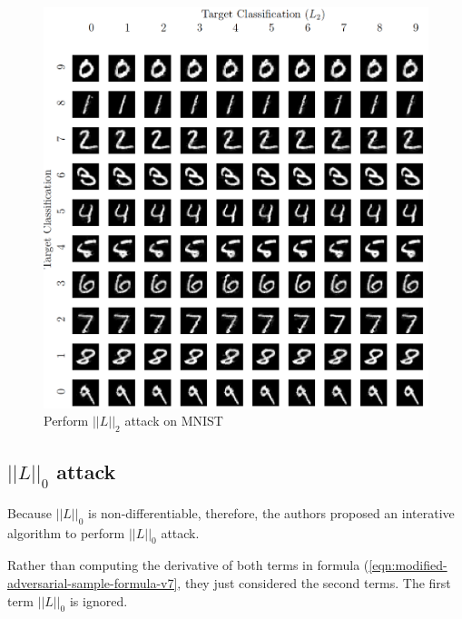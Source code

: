 \documentclass[12pt]{article}
\begin{document}
\begin{figure}[h]
	\centering
	\caption{Perform $||L||_2$ attack on MNIST}
		\label{fig:L2-attack-sample}
	\includegraphics[scale=0.47]{img/L2-attack-sample}
\end{figure}

\subsection{$||L||_0$ attack}
Because $||L||_0$ is non-differentiable, therefore, the authors proposed an interative algorithm to perform $||L||_0$ attack.

Rather than computing the derivative of both terms in formula (\ref{eqn:modified-adversarial-sample-formula-v7}, they just considered the second terms. The first term $||L||_0$ is ignored.
\end{document}
